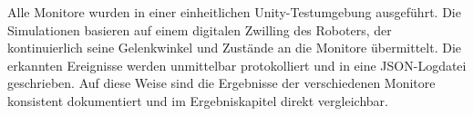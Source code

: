 \noindent
Alle Monitore wurden in einer einheitlichen Unity-Testumgebung ausgeführt.
Die Simulationen basieren auf einem digitalen Zwilling des Roboters, der
kontinuierlich seine Gelenkwinkel und Zustände an die Monitore übermittelt.
Die erkannten Ereignisse werden unmittelbar protokolliert und in eine
JSON-Logdatei geschrieben. Auf diese Weise sind die Ergebnisse der
verschiedenen Monitore konsistent dokumentiert und im Ergebniskapitel
direkt vergleichbar.
